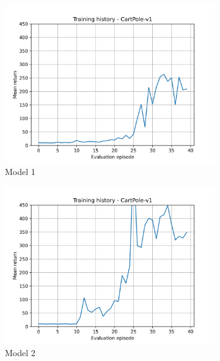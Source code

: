\documentclass[a4paper,10pt]{article}
\begin{document}
\begin{figure}[htbp]
  \centering
  \begin{subfigure}{0.3\textwidth}
    \includegraphics[width=\textwidth]{figures/CartPole_history_1.png}
    \caption{Model 1}
    \label{fig:image1}
  \end{subfigure}
  \hfill
  \begin{subfigure}{0.3\textwidth}
    \includegraphics[width=\textwidth]{figures/CartPole_history_2.png}
    \caption{Model 2}
    \label{fig:image2}
  \end{subfigure}
  \hfill
  \begin{subfigure}{0.3\textwidth}

\end{subfigure}
\end{figure}
\end{document}
